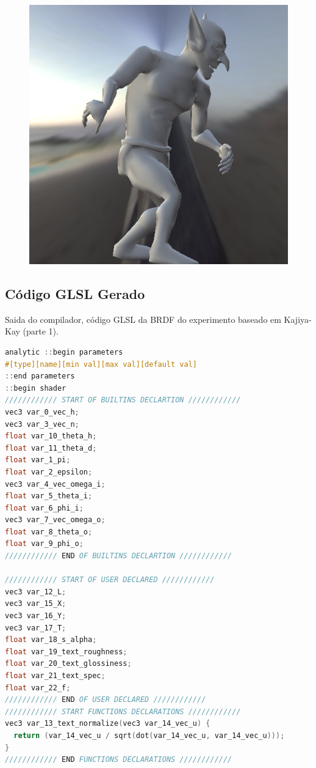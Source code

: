 \begin{figure}[H]
\endminipage\hfill
{}%
  \includegraphics[width=\linewidth]{./Imagens/brdfs/aniso-goblin.png}
\endminipage
\end{figure}

\subsection{Código GLSL Gerado}
\begin{codigo}[H]
    \caption{\small Saida do compilador, código GLSL da BRDF do experimento baseado em Kajiya-Kay (parte 1). }
    \label{cod-kajiya-glsl-pt-1}
\begin{lstlisting}[language=C, inputencoding=utf8]
analytic ::begin parameters
#[type][name][min val][max val][default val]
::end parameters
::begin shader
//////////// START OF BUILTINS DECLARTION ////////////
vec3 var_0_vec_h;
vec3 var_3_vec_n;
float var_10_theta_h;
float var_11_theta_d;
float var_1_pi;
float var_2_epsilon;
vec3 var_4_vec_omega_i;
float var_5_theta_i;
float var_6_phi_i;
vec3 var_7_vec_omega_o;
float var_8_theta_o;
float var_9_phi_o;
//////////// END OF BUILTINS DECLARTION ////////////

//////////// START OF USER DECLARED ////////////
vec3 var_12_L;
vec3 var_15_X;
vec3 var_16_Y;
vec3 var_17_T;
float var_18_s_alpha;
float var_19_text_roughness;
float var_20_text_glossiness;
float var_21_text_spec;
float var_22_f;
//////////// END OF USER DECLARED ////////////
//////////// START FUNCTIONS DECLARATIONS ////////////
vec3 var_13_text_normalize(vec3 var_14_vec_u) {
  return (var_14_vec_u / sqrt(dot(var_14_vec_u, var_14_vec_u)));
}
//////////// END FUNCTIONS DECLARATIONS ////////////
\end{lstlisting}
\end{codigo}

